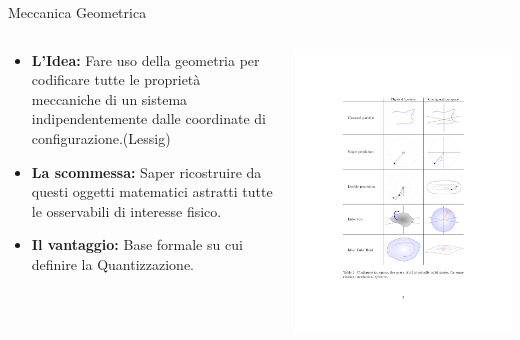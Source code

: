 \documentclass[8pt,handout]{beamer}
\begin{document}
		\begin{frame}{Meccanica Geometrica}
  			\begin{columns}[T]
    			\begin{column}{.5\textwidth}		
					\begin{itemize}
						\item \textbf{L'Idea:} Fare uso della geometria per codificare tutte le proprietà meccaniche di un sistema indipendentemente dalle coordinate di configurazione.(Lessig)
						\item \textbf{La scommessa:} Saper ricostruire da questi oggetti matematici astratti tutte le osservabili di interesse fisico.
						\item \textbf{Il vantaggio:} Base formale su cui definire la Quantizzazione.
					\end{itemize}
    			\end{column}
    		   	\begin{column}{.5\textwidth}
							\includegraphics[width=\textwidth]{Presentazione/GeoMec_Crop} 				
    			\end{column}
  			\end{columns}	
	\end{frame}
\end{document}
